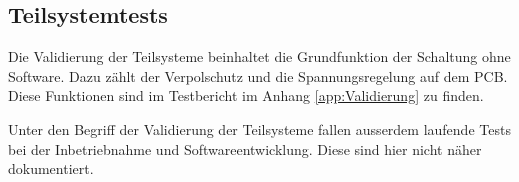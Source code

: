 \subsection{Teilsystemtests}
\label{sec:Teilsystemtests}


Die Validierung der Teilsysteme beinhaltet die Grundfunktion der Schaltung ohne Software. Dazu zählt der Verpolschutz und die Spannungsregelung auf dem PCB. 
Diese Funktionen sind im Testbericht im Anhang \ref{app:Validierung} zu finden. 

Unter den Begriff der Validierung der Teilsysteme fallen ausserdem laufende Tests bei der Inbetriebnahme und Softwareentwicklung. Diese sind hier nicht näher dokumentiert.
